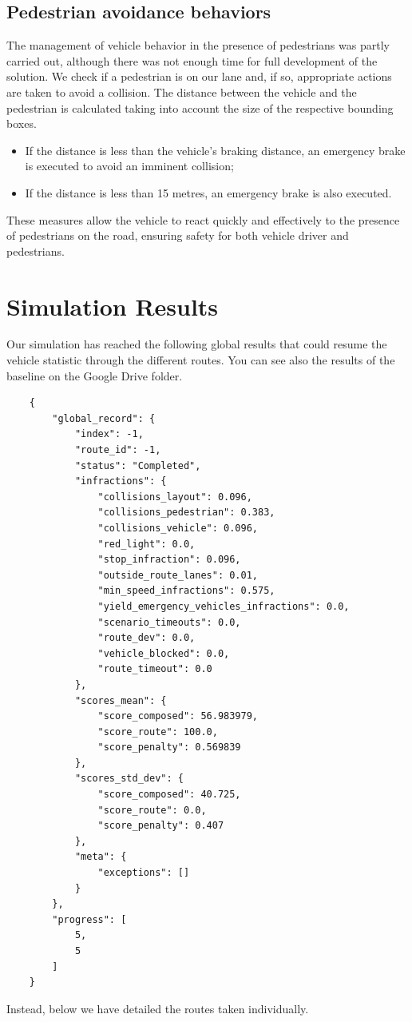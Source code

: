 \documentclass{article}
\begin{document}
\subsection{Pedestrian avoidance behaviors}
The management of vehicle behavior in the presence of pedestrians was partly carried out,
although there was not enough time for full development of the solution.
We check if a pedestrian is on our lane and, if so, appropriate actions are taken to avoid a collision.
The distance between the vehicle and the pedestrian is calculated taking into account the size of the
respective bounding boxes.
\begin{itemize}
    \item If the distance is less than the vehicle's braking distance, an emergency brake is executed to avoid an imminent collision;
    \item If the distance is less than 15 metres, an emergency brake is also executed.
\end{itemize}
These measures allow the vehicle to react quickly and effectively to the presence of pedestrians on the road,
ensuring safety for both vehicle driver and pedestrians.

\section{Simulation Results}
Our simulation has reached the following global results that could resume the vehicle statistic through the different routes.
You can see also the results of the baseline on the Google Drive folder.
\begin{verbatim}
    {
        "global_record": {
            "index": -1,
            "route_id": -1,
            "status": "Completed",
            "infractions": {
                "collisions_layout": 0.096,
                "collisions_pedestrian": 0.383,
                "collisions_vehicle": 0.096,
                "red_light": 0.0,
                "stop_infraction": 0.096,
                "outside_route_lanes": 0.01,
                "min_speed_infractions": 0.575,
                "yield_emergency_vehicles_infractions": 0.0,
                "scenario_timeouts": 0.0,
                "route_dev": 0.0,
                "vehicle_blocked": 0.0,
                "route_timeout": 0.0
            },
            "scores_mean": {
                "score_composed": 56.983979,
                "score_route": 100.0,
                "score_penalty": 0.569839
            },
            "scores_std_dev": {
                "score_composed": 40.725,
                "score_route": 0.0,
                "score_penalty": 0.407
            },
            "meta": {
                "exceptions": []
            }
        },
        "progress": [
            5,
            5
        ]
    }
\end{verbatim}
Instead, below we have detailed the routes taken individually.
\clearpage
\end{document}
